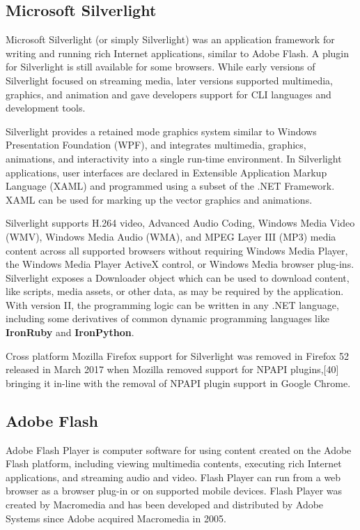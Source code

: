 \subsection{Microsoft Silverlight} \cite{Wiki_Silver}

Microsoft Silverlight (or simply Silverlight) was an application framework for writing and running rich Internet applications, similar to Adobe Flash. 
A plugin for Silverlight is still available for some browsers. 
While early versions of Silverlight focused on streaming media, later versions supported multimedia, graphics, and animation and gave developers support for CLI languages and development tools.

Silverlight provides a retained mode graphics system similar to Windows Presentation Foundation (WPF), and integrates multimedia, graphics, animations, and interactivity into a single run-time environment. 
In Silverlight applications, user interfaces are declared in Extensible Application Markup Language (XAML) and programmed using a subset of the .NET Framework. 
XAML can be used for marking up the vector graphics and animations.

Silverlight supports H.264 video, Advanced Audio Coding, Windows Media Video (WMV), Windows Media Audio (WMA), and MPEG Layer III (MP3) 
media content across all supported browsers without requiring Windows Media Player, the Windows Media Player ActiveX control, or Windows Media browser plug-ins. 
Silverlight exposes a Downloader object which can be used to download content, like scripts, media assets, or other data, as may be required by the application.
With version II, the programming logic can be written in any .NET language, including some derivatives of common dynamic programming languages like \textbf{IronRuby} and \textbf{IronPython}.

Cross platform Mozilla Firefox support for Silverlight was removed in Firefox 52 released in March 2017 when Mozilla removed support for NPAPI plugins,[40] bringing it in-line with the removal of NPAPI plugin support in Google Chrome.

\subsection{Adobe Flash} \cite{Wiki_Flash}

Adobe Flash Player is computer software for using content created on the Adobe Flash platform, including viewing multimedia contents, executing rich Internet applications, and streaming audio and video. 
Flash Player can run from a web browser as a browser plug-in or on supported mobile devices. 
Flash Player was created by Macromedia and has been developed and distributed by Adobe Systems since Adobe acquired Macromedia in 2005. 

